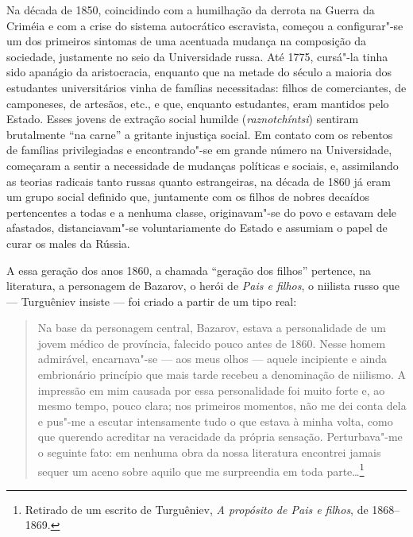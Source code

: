 Na década de 1850, coincidindo com a humilhação da derrota na Guerra da Criméia e
com a crise do sistema autocrático escravista, começou a configurar"-se
um dos primeiros sintomas de uma acentuada mudança na composição da
sociedade, justamente no seio da Universidade russa. Até 1775, cursá"-la tinha
sido apanágio da aristocracia, enquanto que na metade do século  a
maioria dos estudantes universitários vinha de famílias necessitadas:
filhos de comerciantes, de camponeses, de artesãos, etc., e que,
enquanto estudantes, eram mantidos pelo Estado. Esses jovens de extração
social humilde (\emph{raznotchíntsi}) sentiram brutalmente ``na carne'' a
gritante injustiça social. Em contato com os rebentos de famílias
privilegiadas e encontrando"-se em grande número na Universidade,
começaram a sentir a necessidade de mudanças políticas e sociais, e,
assimilando as teorias radicais tanto russas quanto estrangeiras, na
década de 1860 já eram um grupo social definido que, juntamente com os
filhos de nobres decaídos pertencentes a todas e a nenhuma classe,
originavam"-se do povo e estavam dele afastados, distanciavam"-se
voluntariamente do Estado e assumiam o papel de curar os males da
Rússia.

A essa geração dos anos 1860, a chamada ``geração dos filhos'' pertence, na literatura, a personagem de Bazarov, o herói de \emph{Pais
e filhos}, o niilista russo que --- Turguêniev insiste --- foi criado a
partir de um tipo real:

\begin{quote}
Na base da personagem central, Bazarov, estava a personalidade de um
jovem médico de província, falecido pouco antes de 1860. Nesse homem
admirável, encarnava"-se --- aos meus olhos --- aquele incipiente e ainda
embrionário princípio que mais tarde recebeu a denominação de niilismo.
A impressão em mim causada por essa personalidade foi muito forte e, ao
mesmo tempo, pouco clara; nos primeiros momentos, não me dei conta dela
e pus"-me a escutar intensamente tudo o que estava à minha volta, como
que querendo acreditar na veracidade da própria sensação. Perturbava"-me
o seguinte fato: em nenhuma obra da nossa literatura encontrei jamais
sequer um aceno sobre aquilo que me surpreendia em toda parte\ldots{}\footnote{Retirado de um escrito de Turguêniev, \emph{A propósito de \emph{Pais e filhos}}, de 1868--1869.}
\end{quote}

